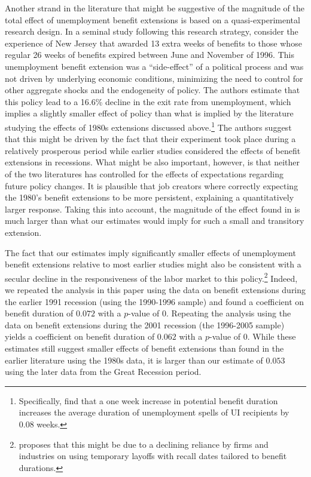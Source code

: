 \documentclass[12pt]{article}
\newcommand{\1}{\mathbf{1}}
\begin{document}
\begin{appendix}
Another strand in the literature that might be suggestive of the magnitude of the total effect of unemployment benefit extensions is based on a quasi-experimental research design. In a seminal study following this research strategy, \citet{card+levine:2000} consider the experience of New Jersey that awarded 13 extra weeks of benefits to those whose regular 26 weeks of benefits expired between June and November of 1996. This unemployment benefit extension was a ``side-effect'' of a political process and was not driven by underlying economic conditions, minimizing the need to control for other aggregate shocks and the endogeneity of policy. The authors estimate that this policy lead to a 16.6\% decline in the exit rate from unemployment, which implies a slightly smaller effect of policy than what is implied by the literature studying the effects of 1980s extensions discussed above.\footnote{Specifically, \citet{card+levine:2000} find that a one week increase in potential benefit duration increases the average duration of  unemployment spells of UI recipients by 0.08 weeks.} The authors suggest that this might be driven by the fact that their experiment took place during a relatively prosperous period while earlier studies considered the effects of benefit extensions in recessions. What might be also important, however, is that neither of the two literatures has controlled for the effects of expectations regarding future policy changes. It is plausible that job creators where correctly expecting the 1980's benefit extensions to be more persistent, explaining a quantitatively larger response. Taking this into account, the magnitude of the effect found in \citet{card+levine:2000} is much larger than what our estimates would imply for such a small and transitory extension.


The fact that our estimates imply significantly smaller effects of unemployment benefit extensions relative to most earlier studies might also be consistent with a secular decline in the responsiveness of the labor market to this policy.\footnote{\citet{katz:10} proposes that this might be due to a declining reliance by firms and industries on using temporary layoffs with recall dates tailored to benefit durations.} Indeed, we repeated the analysis in this paper using the data on benefit extensions during the earlier 1991 recession (using the 1990-1996 sample) and found a coefficient on benefit duration of $0.072$ with a $p$-value of $0$. Repeating the analysis using the data on benefit extensions during the 2001 recession (the 1996-2005 sample) yields a coefficient on benefit duration of $0.062$ with a $p$-value of $0$. While these estimates still suggest smaller effects of benefit extensions than found in the earlier literature using the 1980s data, it is larger than our estimate of $0.053$ using the later data from the Great Recession period.


\end{appendix}
\end{document}
